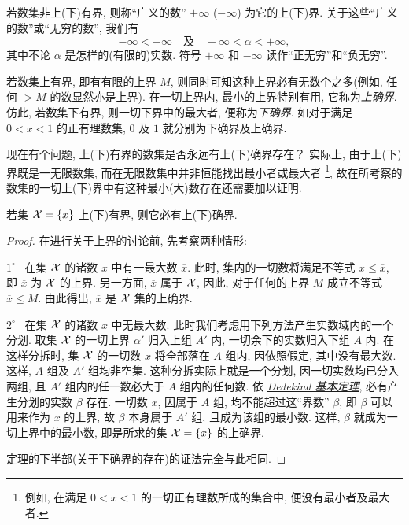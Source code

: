 若数集非上(下)有界,
则称“广义的数” $+\infty$ ($-\infty$) 为它的上(下)界.
关于这些“广义的数”或“无穷的数”, 我们有
$$
-\infty < +\infty \quad \text{及} \quad -\infty < \alpha < +\infty,
$$
其中不论 $\alpha$ 是怎样的(有限的)实数.
符号 $+\infty$ 和 $-\infty$ 读作“正无穷”和“负无穷”.

若数集上有界, 即有有限的上界 $M$,
则同时可知这种上界必有无数个之多(例如, 任何 $> M$ 的数显然亦是上界).
在一切上界内, 最小的上界特别有用,
它称为\emph{上确界}.
仿此, 若数集下有界,
则一切下界中的最大者, 便称为\emph{下确界}.
如对于满足 $0<x<1$ 的正有理数集, $0$ 及 $1$ 就分别为下确界及上确界.

现在有个问题, 上(下)有界的数集是否永远有上(下)确界存在？
实际上, 由于上(下)界既是一无限数集,
而在无限数集中并非恒能找出最小者或最大者
\footnote{例如, 在满足 $0<x<1$ 的一切正有理数所成的集合中, 便没有最小者及最大者.},
故在所考察的数集的一切上(下)界中有这种最小(大)数存在还需要加以证明.

\begin{namedtheorem}[确界存在定理]\label{thm:supremum_infimum_existence}
{\kaishu 若集 $\mathcal{X} = \{x\}$ 上(下)有界, 则它必有上(下)确界.}
\end{namedtheorem}

\begin{proof}
在进行关于上界的讨论前, 先考察两种情形:

$1^\circ$
\ 在集 $\mathcal{X}$ 的诸数 $x$ 中有一最大数 $\overline{x}$.
此时, 集内的一切数将满足不等式 $x \leq \overline{x}$, 即 $\overline{x}$ 为 $\mathcal{X}$ 的上界.
另一方面, $\overline{x}$ 属于 $\mathcal{X}$, 因此, 对于任何的上界 $M$ 成立不等式 $\overline{x} \leq M$.
由此得出, $\overline{x}$ 是 $\mathcal{X}$ 集的上确界.

$2^\circ$
\ 在集 $\mathcal{X}$ 的诸数 $x$ 中无最大数.
此时我们考虑用下列方法产生实数域内的一个分划.
取集 $\mathcal{X}$ 的一切上界 $\alpha'$ 归入上组 $A'$ 内,
一切余下的实数归入下组 $A$ 内.
在这样分拆时, 集 $\mathcal{X}$ 的一切数 $x$ 将全部落在 $A$ 组内,
因依照假定, 其中没有最大数.
这样, $A$ 组及 $A'$ 组均非空集.
这种分拆实际上就是一个分划,
因一切实数均已分入两组, 且 $A'$ 组内的任一数必大于 $A$ 组内的任何数.
依 \hyperref[thm:dedekind_cut]{\emph{Dedekind 基本定理}}, 必有产生分划的实数 $\beta$ 存在.
一切数 $x$, 因属于 $A$ 组, 均不能超过这“界数” $\beta$,
即 $\beta$ 可以用来作为 $x$ 的上界,
故 $\beta$ 本身属于 $A'$ 组, 且成为该组的最小数.
这样, $\beta$ 就成为一切上界中的最小数,
即是所求的集 $\mathcal{X} = \{x\}$ 的上确界.

定理的下半部(关于下确界的存在)的证法完全与此相同.
\end{proof}

